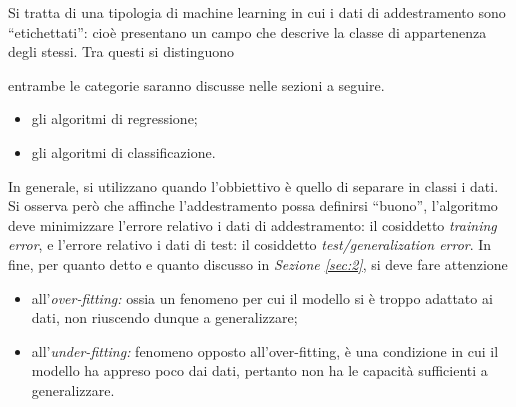\documentclass{subfiles}
\begin{document}
Si tratta di una tipologia di machine learning in cui i dati di addestramento sono ``etichettati'':
cioè presentano un campo che descrive la classe di appartenenza degli stessi.
Tra questi si distinguono
\begin{MarginNote}
    entrambe le categorie saranno discusse nelle sezioni a seguire.
\end{MarginNote}
\begin{itemize}
    \item gli algoritmi di regressione;
    \item gli algoritmi di classificazione.
\end{itemize}
In generale, si utilizzano quando l'obbiettivo è quello di separare in classi i dati.
Si osserva però che affinche l'addestramento possa definirsi ``buono'', l'algoritmo deve minimizzare l'errore relativo i dati di addestramento:
il cosiddetto \emph{training error}, e l'errore relativo i dati di test: il cosiddetto \emph{test/generalization error}.
In fine, per quanto detto e quanto discusso in \emph{Sezione \ref{sec:2}}, si deve fare attenzione
\begin{itemize}
    \item all'\emph{over-fitting:} ossia un fenomeno per cui il modello si è troppo adattato ai dati, non riuscendo dunque a generalizzare;
    \item all'\emph{under-fitting:} fenomeno opposto all'over-fitting, è una condizione in cui il modello ha appreso poco dai dati,
          pertanto non ha le capacità sufficienti a generalizzare.
\end{itemize}
\end{document}
